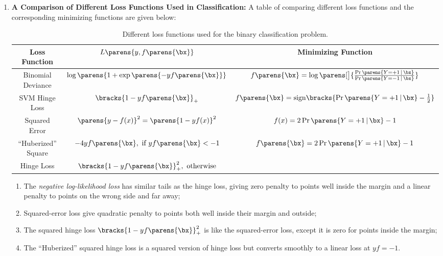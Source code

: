 \documentclass[12pt]{article}
\begin{document}
\begin{enumerate}[label=\textbf{\arabic*.}]
	\item \textbf{A Comparison of Different Loss Functions Used in Classification:} A table of comparing different loss functions and the corresponding minimizing functions are given below: 
	
	\begin{table}
		\begin{center}
			\begin{tabular}{ccc}  
				\toprule
				Loss Function & $L \parens{y, f \parens{\bx}}$ & Minimizing Function \\ 
				\toprule
				Binomial Deviance & $\log \parens{1 + \exp \parens{-yf \parens{\bx}}}$ & $f \parens{\bx} = \log \parens[\big]{\frac{\Pr \parens{Y = +1 \,\vert\, \bx}}{\Pr \parens{Y = -1 \,\vert\, \bx}}}$ \\
				\midrule
				SVM Hinge Loss & $\bracks{1 - y f \parens{\bx}}_+$ & $f \parens{\bx} = \mathrm{sign} \bracks{\Pr \parens{Y = +1 \,\vert\, \bx} - \frac{1}{2}}$ \\ 
				\midrule 
				Squared Error & $\parens{y - f(x)}^2 = \parens{1 - yf(x)}^2$ & $f(x) = 2 \Pr \parens{Y = +1 \,\vert\, \bx} - 1$\\
				\midrule
				``Huberized'' Square & $-4yf \parens{\bx}, \text{ if } yf \parens{\bx} < -1$ & $f \parens{\bx} = 2 \Pr \parens{Y = +1 \,\vert\, \bx} - 1$ \\ 
				Hinge Loss & $\bracks{1-yf \parens{\bx}}_+^2, \text{ otherwise} $ &  \\
				\bottomrule
			\end{tabular}
		\caption{Different loss functions used for the binary classification problem. }
		\label{table-1}
		\end{center}
	\end{table}
	
	
	\begin{enumerate}
		\item The \textit{negative log-likelihood loss} has similar tails as the hinge loss, giving zero penalty to points well inside the margin and a linear penalty to points on the wrong side and far away; 
		\item Squared-error loss give quadratic penalty to points both well inside their margin and outside; 
		\item The squared hinge loss $\bracks{1 - yf \parens{\bx}}_+^2$ is like the squared-error loss, except it is zero for points inside the margin; 
		\item The ``Huberized'' squared hinge loss is a squared version of hinge loss but converts smoothly to a linear loss at $yf = -1$. 
	\end{enumerate}
	

\end{enumerate}
\end{document}
